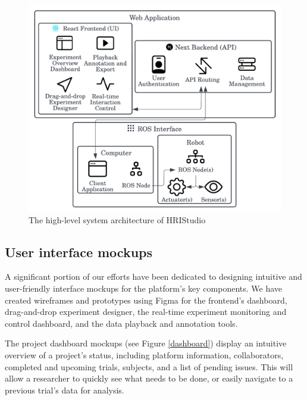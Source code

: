 \documentclass[letterpaper, 10 pt, conference]{ieeeconf}
\begin{document}
\begin{figure}[ht]
   \vskip -0.3cm
    \begin{center}
        \includegraphics[width=0.4\paperwidth]{assets/diagrams/highlevelarchitecture}
        \vskip -0.3cm
        \caption{The high-level system architecture of HRIStudio}
        \label{highlevelarchitecture}
    \end{center}
     \vskip -0.4cm
\end{figure}

\subsection{User interface mockups}

A significant portion of our efforts have been dedicated to designing intuitive and user-friendly interface mockups for the platform's key components. We have created wireframes and prototypes using Figma for the frontend's dashboard, drag-and-drop experiment designer, the real-time experiment monitoring and control dashboard, and the data playback and annotation tools.

The project dashboard mockups (see Figure \ref{dashboard}) display an intuitive overview of a project's status, including platform information, collaborators, completed and upcoming trials, subjects, and a list of pending issues. This will allow a researcher to quickly see what needs to be done, or easily navigate to a previous trial's data for analysis.
\end{document}
